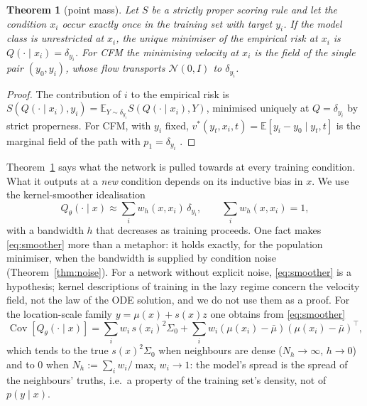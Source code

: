\documentclass[11pt]{article}
\newtheorem{theorem}{Theorem}
\newcommand{\E}{\mathbb{E}}
\begin{document}
\begin{theorem}[point mass]
\label{thm:delta}
Let $S$ be a strictly proper scoring rule and let the condition $x_i$ occur exactly once in the training set with target $y_i$. If the model class is unrestricted at $x_i$, the unique minimiser of the empirical risk at $x_i$ is $Q(\cdot\mid x_i)=\delta_{y_i}$. For CFM the minimising velocity at $x_i$ is the field of the single pair $(y_0,y_i)$, whose flow transports $\mathcal N(0,I)$ to $\delta_{y_i}$.
\end{theorem}
\begin{proof}
The contribution of $i$ to the empirical risk is $S(Q(\cdot\mid x_i),y_i)=\E_{Y\sim\delta_{y_i}}S(Q(\cdot\mid x_i),Y)$, minimised uniquely at $Q=\delta_{y_i}$ by strict properness. For CFM, with $y_i$ fixed, $v^\ast(y_t,x_i,t)=\E[y_i-y_0\mid y_t,t]$ is the marginal field of the path with $p_1=\delta_{y_i}$ \citep[Thm.~1]{lipman2023flow}.
\end{proof}

Theorem~\ref{thm:delta} says what the network is pulled towards at every training condition. What it outputs at a \emph{new} condition depends on its inductive bias in $x$. We use the kernel-smoother idealisation
\begin{equation}
Q_\theta(\cdot\mid x)\approx\sum_i w_h(x,x_i)\,\delta_{y_i},\qquad \sum_i w_h(x,x_i)=1,
\label{eq:smoother}
\end{equation}
with a bandwidth $h$ that decreases as training proceeds. One fact makes \eqref{eq:smoother} more than a metaphor: it holds exactly, for the population minimiser, when the bandwidth is supplied by condition noise (Theorem~\ref{thm:noise}). For a network without explicit noise, \eqref{eq:smoother} is a hypothesis; kernel descriptions of training in the lazy regime \citep{jacot2018ntk} concern the velocity field, not the law of the ODE solution, and we do not use them as a proof. For the location-scale family $y=\mu(x)+s(x)z$ one obtains from \eqref{eq:smoother}
\begin{equation}
\operatorname{Cov}[Q_\theta(\cdot\mid x)]=\sum_i w_i\,s(x_i)^2\Sigma_0+\sum_i w_i(\mu(x_i)-\bar\mu)(\mu(x_i)-\bar\mu)^\top ,
\label{eq:cov}
\end{equation}
which tends to the true $s(x)^2\Sigma_0$ when neighbours are dense ($N_h\to\infty$, $h\to0$) and to $0$ when $N_h:=\sum_iw_i/\max_iw_i\to1$: the model's spread is the spread of the neighbours' truths, i.e.\ a property of the training set's density, not of $p(y\mid x)$.
\end{document}

